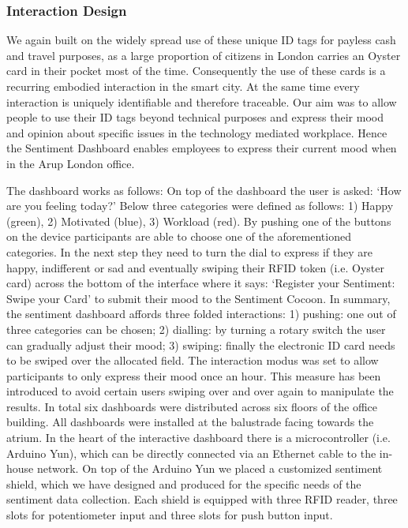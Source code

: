 \subsubsection{Interaction Design}

We again built on the widely spread use of these unique ID tags for payless cash and travel purposes, as a large proportion of citizens in London carries an Oyster card in their pocket most of the time. Consequently the use of these cards is a recurring embodied interaction in the smart city. At the same time every interaction is uniquely identifiable and therefore traceable. Our aim was to allow people to use their ID tags beyond technical purposes and express their mood and opinion about specific issues in the technology mediated workplace. Hence the Sentiment Dashboard enables employees to express their current mood when in the Arup London office. 

The dashboard works as follows: On top of the dashboard the user is asked: ‘How are you feeling today?’ Below three categories were defined as follows: 1) Happy (green), 2) Motivated (blue), 3) Workload (red). By pushing one of the buttons on the device participants are able to choose one of the aforementioned categories. In the next step they need to turn the dial to express if they are happy, indifferent or sad and eventually swiping their RFID token (i.e. Oyster card) across the bottom of the interface where it says: ‘Register your Sentiment: Swipe your Card’ to submit their mood to the Sentiment Cocoon. In summary, the sentiment dashboard affords three folded interactions: 1) pushing: one out of three categories can be chosen; 2) dialling: by turning a rotary switch the user can gradually adjust their mood; 3) swiping: finally the electronic ID card needs to be swiped over the allocated field.
The interaction modus was set to allow participants to only express their mood once an hour. This measure has been introduced to avoid certain users swiping over and over again to manipulate the results. 
In total six dashboards were distributed across six floors of the office building. All dashboards were installed at the balustrade facing towards the atrium. 
In the heart of the interactive dashboard there is a microcontroller (i.e. Arduino Yun), which can be directly connected via an Ethernet cable to the in-house network. On top of the Arduino Yun we placed a customized sentiment shield, which we have designed and produced for the specific needs of the sentiment data collection. Each shield is equipped with three RFID reader, three slots for potentiometer input and three slots for push button input.


